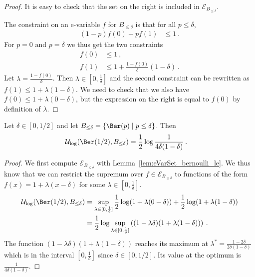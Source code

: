 \begin{proof}\leanok
It is easy to check that the set on the right is included in $\mathcal{E}_{B_{\le \delta}}$.

The constraint on an e-variable $f$ for $B_{\le \delta}$ is that for all $p \le \delta$,
\begin{align*}
  (1 - p) f(0) + p f(1)
  &\le 1
  \: .
\end{align*}
For $p=0$ and $p=\delta$ we thus get the two constraints
\begin{align*}
  f(0)
  &\le 1
  \: , \\
  f(1)
  &\le 1 + \frac{1 - f(0)}{\delta}(1 - \delta)
  \: .
\end{align*}
Let $\lambda = \frac{1 - f(0)}{\delta}$.
Then $\lambda \in [0, \frac{1}{\delta}]$ and the second constraint can be rewritten as $f(1) \le 1 + \lambda (1 - \delta)$.
We need to check that we also have $f(0) \le 1 + \lambda (0 - \delta)$, but the expression on the right is equal to $f(0)$ by definition of $\lambda$.
\end{proof}


\begin{lemma}\label{lem:maxUtility_bernoulli_half_le}
  \leanok
Let $\delta \in [0,1/2]$ and let $B_{\le \delta} = \{\Ber(p) \mid p \le \delta\}$.
Then
\begin{align*}
  \mathcal{U}_{\log}(\Ber(1/2), B_{\le \delta})
  &= \frac{1}{2} \log \frac{1}{4 \delta (1 - \delta)}
  \: .
\end{align*}
\end{lemma}

\begin{proof}\leanok
We first compute $\mathcal{E}_{B_{\le \delta}}$ with Lemma~\ref{lem:eVarSet_bernoulli_le}.
We thus know that we can restrict the supremum over $f \in \mathcal{E}_{B_{\le \delta}}$ to functions of the form $f(x) = 1 + \lambda (x - \delta)$ for some $\lambda \in [0, \frac{1}{\delta}]$.
\begin{align*}
  \mathcal{U}_{\log}(\Ber(1/2), B_{\le \delta})
  &= \sup_{\lambda \in [0, \frac{1}{\delta}]} \frac{1}{2} \log (1 + \lambda (0 - \delta)) + \frac{1}{2} \log (1 + \lambda (1 - \delta))
  \\
  &= \frac{1}{2} \log \sup_{\lambda \in [0, \frac{1}{\delta}]} \left((1 - \lambda \delta)(1 + \lambda (1 - \delta))\right)
  \: .
\end{align*}
The function $(1 - \lambda \delta)(1 + \lambda (1 - \delta))$ reaches its maximum at $\lambda^* = \frac{1 - 2\delta}{2\delta (1 - \delta)}$ which is in the interval $[0, \frac{1}{\delta}]$ since $\delta \in [0,1/2]$.
Its value at the optimum is $\frac{1}{4 \delta (1 - \delta)}$.
\end{proof}


